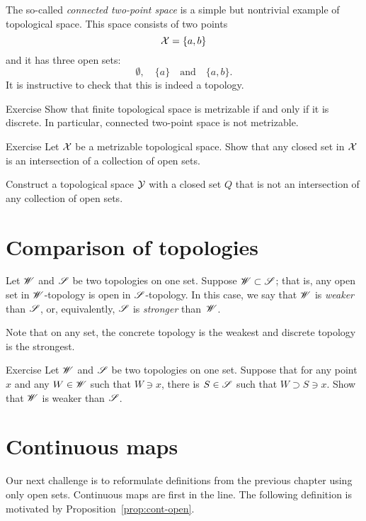The so-called \emph{connected two-point space} is a simple but nontrivial example of topological space.
This space consists of two points 
\[\mathcal{X}=\{a,b\}\]
and it has three open sets: 
\[\emptyset,\quad \{a\}\quad\text{and}\quad\{a,b\}.\]
It is instructive to check that this is indeed a topology.

\begin{thm}{Exercise}\label{ex:finite+metrizable}
Show that finite topological space is metrizable if and only if it is discrete.
In particular, connected two-point space is not metrizable.
\end{thm}

\begin{thm}{Exercise}\label{ex:open-intersection+metrizable}
Let $\mathcal{X}$ be a metrizable topological space.
Show that any closed set in $\mathcal{X}$ is an intersection of a collection of open sets.

Construct a topological space $\mathcal{Y}$ with a closed set $Q$ that is not an intersection of any collection of open sets.
\end{thm}


\section{Comparison of topologies}

Let $\mathscr{W}$ and $\mathscr{S}$ be two topologies on one set.
Suppose $\mathscr{W}\subset\mathscr{S}$; that is, any open set in $\mathscr{W}$-topology is open in $\mathscr{S}$-topology.
In this case, we say that $\mathscr{W}$ is \emph{weaker} than $\mathscr{S}$, or, equivalently, $\mathscr{S}$ is \emph{stronger} than~$\mathscr{W}$.

Note that on any set, the concrete topology is the weakest and discrete topology is the strongest.

\begin{thm}{Exercise}\label{ex:weaker-top}
Let $\mathscr{W}$ and $\mathscr{S}$ be two topologies on one set.
Suppose that for any point $x$ and any $W\in\mathscr{W}$ such that $W\ni x$, there is $S\in \mathscr{S}$ such that 
$W\supset S\ni x$.
Show that $\mathscr{W}$ is weaker than $\mathscr{S}$.
\end{thm}



\section{Continuous maps}

Our next challenge is to reformulate definitions from the previous chapter using only open sets.
Continuous maps are first in the line.
The following definition is motivated by Proposition~\ref{prop:cont-open}.

